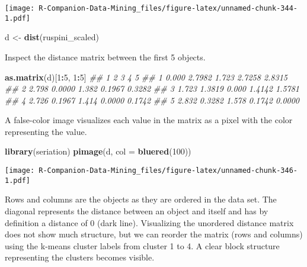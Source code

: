 \documentclass[
  notitlepage]{book}
\newenvironment{Shaded}{\begin{snugshade}}{\end{snugshade}}
\newcommand{\CommentTok}[1]{\textcolor[rgb]{0.56,0.35,0.01}{\textit{#1}}}
\newcommand{\DataTypeTok}[1]{\textcolor[rgb]{0.13,0.29,0.53}{#1}}
\newcommand{\DecValTok}[1]{\textcolor[rgb]{0.00,0.00,0.81}{#1}}
\newcommand{\KeywordTok}[1]{\textcolor[rgb]{0.13,0.29,0.53}{\textbf{#1}}}
\newcommand{\NormalTok}[1]{#1}
\newcommand{\OperatorTok}[1]{\textcolor[rgb]{0.81,0.36,0.00}{\textbf{#1}}}
\newcommand{\StringTok}[1]{\textcolor[rgb]{0.31,0.60,0.02}{#1}}
\begin{document}
\begin{Shaded}
\end{Shaded}

\texttt{[image: R-Companion-Data-Mining\_files/figure-latex/unnamed-chunk-344-1.pdf]}

\begin{Shaded}
\begin{Highlighting}[]
\NormalTok{d \textless{}{-}}\StringTok{ }\KeywordTok{dist}\NormalTok{(ruspini\_scaled)}
\end{Highlighting}
\end{Shaded}

Inspect the distance matrix between the first 5 objects.

\begin{Shaded}
\begin{Highlighting}[]
\KeywordTok{as.matrix}\NormalTok{(d)[}\DecValTok{1}\OperatorTok{:}\DecValTok{5}\NormalTok{, }\DecValTok{1}\OperatorTok{:}\DecValTok{5}\NormalTok{]}
\CommentTok{\#\#       1      2     3      4      5}
\CommentTok{\#\# 1 0.000 2.7982 1.723 2.7258 2.8315}
\CommentTok{\#\# 2 2.798 0.0000 1.382 0.1967 0.3282}
\CommentTok{\#\# 3 1.723 1.3819 0.000 1.4142 1.5781}
\CommentTok{\#\# 4 2.726 0.1967 1.414 0.0000 0.1742}
\CommentTok{\#\# 5 2.832 0.3282 1.578 0.1742 0.0000}
\end{Highlighting}
\end{Shaded}

A false-color image visualizes each value in the matrix as a pixel with
the color representing the value.

\begin{Shaded}
\begin{Highlighting}[]
\KeywordTok{library}\NormalTok{(seriation)}
\KeywordTok{pimage}\NormalTok{(d, }\DataTypeTok{col =} \KeywordTok{bluered}\NormalTok{(}\DecValTok{100}\NormalTok{))}
\end{Highlighting}
\end{Shaded}

\texttt{[image: R-Companion-Data-Mining\_files/figure-latex/unnamed-chunk-346-1.pdf]}

Rows and columns are the objects as they are ordered in the data set.
The diagonal represents the distance between an object and itself and
has by definition a distance of 0 (dark line). Visualizing the unordered
distance matrix does not show much structure, but we can reorder the
matrix (rows and columns) using the k-means cluster labels from cluster
1 to 4. A clear block structure representing the clusters becomes
visible.
\end{document}
